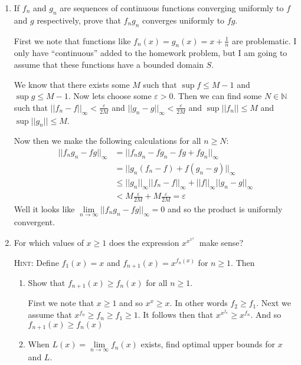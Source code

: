 \documentclass[letterpaper]{article}
\begin{document}
\begin{enumerate}
  \item
  If $f_n$ and $g_n$ are sequences of continuous functions converging uniformly to $f$ and $g$ respectively, prove that $f_ng_n$ converges uniformly  to $fg$. 

  First we note that functions like $f_n(x)=g_n(x)=x+\frac{1}{n}$ are problematic. I only have ``continuous'' added to the homework problem, but I am going to assume that these functions have a bounded domain $S$.

  We know that there exists some $M$ such that $\sup f\le M-1$ and $\sup g\le M-1$. Now lets choose some $\varepsilon>0$. Then we can find some $N\in \mathbb{N}$ such that $||f_n-f||_\infty<\frac{\varepsilon}{2M}$ and $||g_n-g||_\infty<\frac{\varepsilon}{2M}$ and $\sup ||f_n||\le M$ and $\sup ||g_n||\le M$.

  Now then we make the following calculations for all $n\ge N$:
  \begin{align*}
    ||f_ng_n-fg||_\infty&=||f_ng_n-fg_n-fg+fg_n||_\infty\\
    &=||g_n(f_n-f)+f(g_n-g)||_\infty\\
    &\le ||g_n||_\infty||f_n-f||_\infty+||f||_\infty||g_n-g||_\infty\\
    &< M\frac{\varepsilon}{2M}+M\frac{\varepsilon}{2M}=\varepsilon
  \end{align*}
  Well it looks like $\lim\limits_{n\to\infty}||f_ng_n-fg||_\infty=0$ and so the product is uniformly convergent.
  \item
  For which values of $x\ge 1$ does the expression $x^{x^{x^{x^{\cdot^{\cdot^{\cdot}}}}}}$ make sense?

  {\scshape Hint:} Define $f_1(x)=x$ and $f_{n+1}(x)=x^{f_n(x)}$ for $n\ge 1$. Then
  \begin{enumerate}
  \item
    Show that $f_{n+1}(x)\ge f_n(x)$ for all $n\ge 1$.

    First we note that $x\ge 1$ and so $x^x\ge x$. In other words $f_2\ge f_1$. Next we assume that $x^{f_n}\ge f_n\ge f_1\ge 1$. It follows then that $x^{x^{f_n}}\ge x^{f_n}$. And so $f_{n+1}(x)\ge f_n(x)$
  \item
    When $L(x)=\lim\limits_{n\to\infty}f_n(x)$ exists, find optimal upper bounds for $x$ and $L$.


\end{enumerate}
\end{enumerate}
\end{document}
